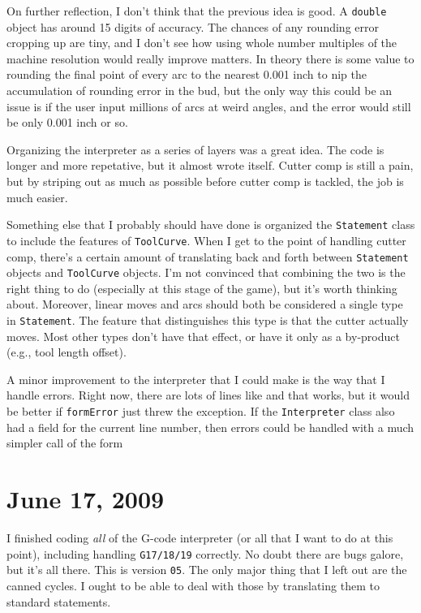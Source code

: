 \documentclass[titlepage,oneside,10pt]{article}
\begin{document}
On further reflection, I don't think that the previous idea is good. A
{\tt double} object has around 15 digits of accuracy. The chances of
any rounding error cropping up are tiny, and I don't see how using
whole number multiples of the machine resolution would really improve
matters. In theory there is some value to rounding the final point of
every arc to the nearest 0.001 inch to nip the accumulation of
rounding error in the bud, but the only way this could be an issue is
if the user input millions of arcs at weird angles, and the error
would still be only 0.001 inch or so.

Organizing the interpreter as a series of layers was a great idea. The
code is longer and more repetative, but it almost wrote itself. Cutter
comp is still a pain, but by striping out as much as possible before
cutter comp is tackled, the job is much easier.

Something else that I probably should have done is organized the 
{\tt Statement} class to include the features of {\tt ToolCurve}. When
I get to the point of handling cutter comp, there's a certain amount
of translating back and forth between {\tt Statement} objects and 
{\tt ToolCurve} objects. I'm not convinced that combining the two is
the right thing to do (especially at this stage of the game), but it's
worth thinking about. Moreover, linear moves and arcs should both be
considered a single type in {\tt Statement}. The feature that
distinguishes this type is that the cutter actually moves. Most other
types don't have that effect, or have it only as a by-product (e.g.,
tool length offset).

A minor improvement to the interpreter that I could make is the way
that I handle errors. Right now, there are lots of lines like
\vskip 0.10cm
\vskip 0.10cm
\noindent and that works, but it would be better if {\tt formError} just threw
the exception. If the {\tt Interpreter} class also had a field for the
current line number, then errors could be handled with a much simpler
call of the form
\vskip 0.10cm
\vskip 0.10cm

\section{June 17, 2009}

I finished coding \emph{all} of the G-code interpreter (or all that I
want to do at this point), including handling {\tt G17/18/19}
correctly. No doubt there are bugs galore, but it's all there. This is
version {\tt 05}. The only major thing that I left out are the canned
cycles. I ought to be able to deal with those by translating them to
standard statements.
\end{document}
